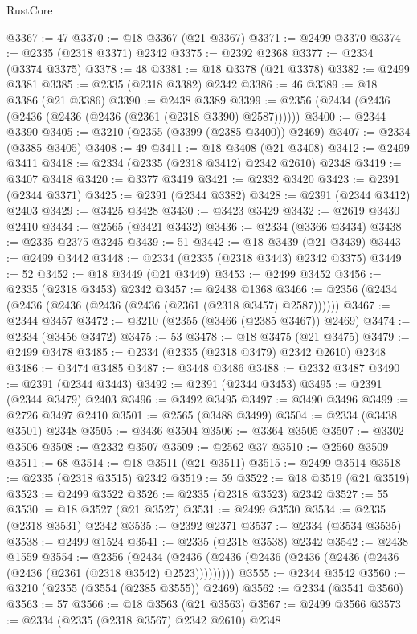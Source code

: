 \begin{lexlean}{RustCore}
\begin{coremodule}
@3367 := 47
@3370 := @18 @3367 (@21 @3367)
@3371 := @2499 @3370
@3374 := @2335 (@2318 @3371) @2342
@3375 := @2392 @2368
@3377 := @2334 (@3374 @3375)
@3378 := 48
@3381 := @18 @3378 (@21 @3378)
@3382 := @2499 @3381
@3385 := @2335 (@2318 @3382) @2342
@3386 := 46
@3389 := @18 @3386 (@21 @3386)
@3390 := @2438 @3389
@3399 := @2356 (@2434 (@2436 (@2436 (@2436 (@2436 (@2361 (@2318 @3390) @2587))))))
@3400 := @2344 @3390
@3405 := @3210 (@2355 (@3399 (@2385 @3400)) @2469)
@3407 := @2334 (@3385 @3405)
@3408 := 49
@3411 := @18 @3408 (@21 @3408)
@3412 := @2499 @3411
@3418 := @2334 (@2335 (@2318 @3412) @2342 @2610) @2348
@3419 := @3407 @3418
@3420 := @3377 @3419
@3421 := @2332 @3420
@3423 := @2391 (@2344 @3371)
@3425 := @2391 (@2344 @3382)
@3428 := @2391 (@2344 @3412) @2403
@3429 := @3425 @3428
@3430 := @3423 @3429
@3432 := @2619 @3430 @2410
@3434 := @2565 (@3421 @3432)
@3436 := @2334 (@3366 @3434)
@3438 := @2335 @2375 @3245
@3439 := 51
@3442 := @18 @3439 (@21 @3439)
@3443 := @2499 @3442
@3448 := @2334 (@2335 (@2318 @3443) @2342 @3375)
@3449 := 52
@3452 := @18 @3449 (@21 @3449)
@3453 := @2499 @3452
@3456 := @2335 (@2318 @3453) @2342
@3457 := @2438 @1368
@3466 := @2356 (@2434 (@2436 (@2436 (@2436 (@2436 (@2361 (@2318 @3457) @2587))))))
@3467 := @2344 @3457
@3472 := @3210 (@2355 (@3466 (@2385 @3467)) @2469)
@3474 := @2334 (@3456 @3472)
@3475 := 53
@3478 := @18 @3475 (@21 @3475)
@3479 := @2499 @3478
@3485 := @2334 (@2335 (@2318 @3479) @2342 @2610) @2348
@3486 := @3474 @3485
@3487 := @3448 @3486
@3488 := @2332 @3487
@3490 := @2391 (@2344 @3443)
@3492 := @2391 (@2344 @3453)
@3495 := @2391 (@2344 @3479) @2403
@3496 := @3492 @3495
@3497 := @3490 @3496
@3499 := @2726 @3497 @2410
@3501 := @2565 (@3488 @3499)
@3504 := @2334 (@3438 @3501) @2348
@3505 := @3436 @3504
@3506 := @3364 @3505
@3507 := @3302 @3506
@3508 := @2332 @3507
@3509 := @2562 @37
@3510 := @2560 @3509
@3511 := 68
@3514 := @18 @3511 (@21 @3511)
@3515 := @2499 @3514
@3518 := @2335 (@2318 @3515) @2342
@3519 := 59
@3522 := @18 @3519 (@21 @3519)
@3523 := @2499 @3522
@3526 := @2335 (@2318 @3523) @2342
@3527 := 55
@3530 := @18 @3527 (@21 @3527)
@3531 := @2499 @3530
@3534 := @2335 (@2318 @3531) @2342
@3535 := @2392 @2371
@3537 := @2334 (@3534 @3535)
@3538 := @2499 @1524
@3541 := @2335 (@2318 @3538) @2342
@3542 := @2438 @1559
@3554 := @2356
    (@2434 (@2436 (@2436 (@2436 (@2436 (@2436 (@2436 (@2436 (@2361 (@2318 @3542) @2523)))))))))
@3555 := @2344 @3542
@3560 := @3210 (@2355 (@3554 (@2385 @3555)) @2469)
@3562 := @2334 (@3541 @3560)
@3563 := 57
@3566 := @18 @3563 (@21 @3563)
@3567 := @2499 @3566
@3573 := @2334 (@2335 (@2318 @3567) @2342 @2610) @2348

\end{coremodule}
\end{lexlean}
